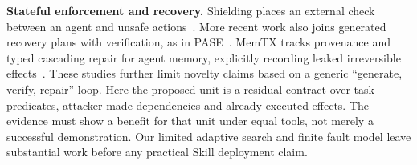 \textbf{Stateful enforcement and recovery.} Shielding places an external check between an agent and unsafe actions~\cite{shield}. More recent work also joins generated recovery plans with verification, as in PASE~\cite{pase}. MemTX tracks provenance and typed cascading repair for agent memory, explicitly recording leaked irreversible effects~\cite{memtx}. These studies further limit novelty claims based on a generic ``generate, verify, repair'' loop. Here the proposed unit is a residual contract over task predicates, attacker-made dependencies and already executed effects. The evidence must show a benefit for that unit under equal tools, not merely a successful demonstration. Our limited adaptive search and finite fault model leave substantial work before any practical Skill deployment claim.
